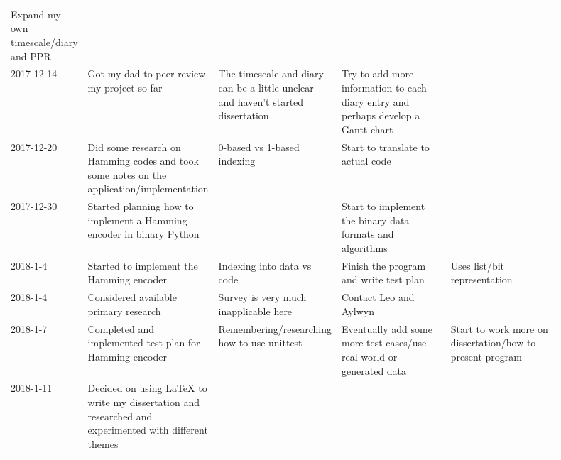 \documentclass{article}
\begin{document}
\begin{center}
{\begin{longtable}{p{0.1\linewidth} p{0.2\linewidth} p{0.2\linewidth} p{0.2\linewidth} p{0.2\linewidth}}
    Expand my own timescale/diary and PPR &

    \\ 2017-12-14 &

    Got my dad to peer review my project so far &

    The timescale and diary can be a little unclear and haven't started
    dissertation &

    Try to add more information to each diary entry and perhaps develop a Gantt
    chart &

    \\ 2017-12-20 &

    Did some research on Hamming codes and took some notes on the
    application/implementation &

    0-based vs 1-based indexing &

    Start to translate to actual code &

    \\ 2017-12-30 &

    Started planning how to implement a Hamming encoder in binary Python &

    &

    Start to implement the binary data formats and algorithms &

    \\ 2018-1-4 &

    Started to implement the Hamming encoder &

    Indexing into data vs code &

    Finish the program and write test plan &

    Uses list/bit representation \\ 2018-1-4 &

    Considered available primary research &

    Survey is very much inapplicable here &

    Contact Leo and Aylwyn &

    \\ 2018-1-7 &

    Completed and implemented test plan for Hamming encoder &

    Remembering/researching how to use unittest &

    Eventually add some more test cases/use real world or generated data &

    Start to work more on dissertation/how to present program \\ 2018-1-11 &

    Decided on using LaTeX to write my dissertation and researched and
    experimented with different themes &


\end{longtable}}
\end{center}
\end{document}
